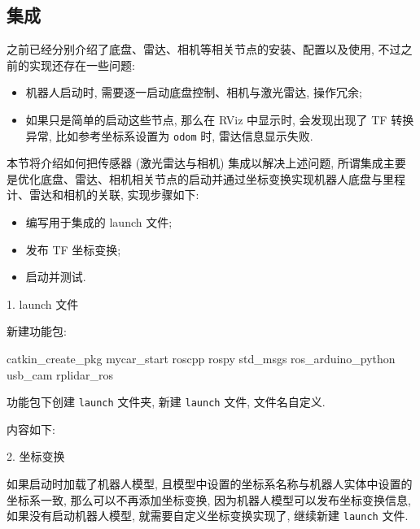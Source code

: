\documentclass[openany, fontset=windowsold]{ctexbook}
\theoremstyle{kaiti}
\theoremstyle{normal}
\begin{document}
\subsection{集成}

之前已经分别介绍了底盘、雷达、相机等相关节点的安装、配置以及使用, 不过之前的实现还存在一些问题:

\begin{itemize}
  \item 机器人启动时, 需要逐一启动底盘控制、相机与激光雷达, 操作冗余; 
  \item 如果只是简单的启动这些节点, 那么在 RViz 中显示时, 会发现出现了 TF 转换异常, 比如参考坐标系设置为 \verb|odom| 时, 雷达信息显示失败.
\end{itemize}

本节将介绍如何把传感器 (激光雷达与相机) 集成以解决上述问题, 所谓集成主要是优化底盘、雷达、相机相关节点的启动并通过坐标变换实现机器人底盘与里程计、雷达和相机的关联, 实现步骤如下:

\begin{itemize}
  \item 编写用于集成的 launch 文件; 
  \item 发布 TF 坐标变换; 
  \item 启动并测试.
\end{itemize}

1. launch 文件

新建功能包:

\begin{bash}
  catkin_create_pkg mycar_start roscpp rospy std_msgs ros_arduino_python usb_cam rplidar_ros
\end{bash}

功能包下创建 \verb|launch| 文件夹, 新建 \verb|launch| 文件, 文件名自定义.

内容如下:


2. 坐标变换

如果启动时加载了机器人模型, 且模型中设置的坐标系名称与机器人实体中设置的坐标系一致, 那么可以不再添加坐标变换, 因为机器人模型可以发布坐标变换信息, 如果没有启动机器人模型, 就需要自定义坐标变换实现了, 继续新建 \verb|launch| 文件.
\end{document}
